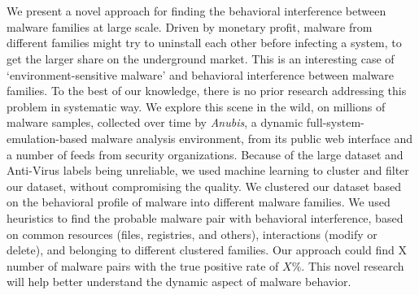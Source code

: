 \chapter{\abstractname}
We present a novel approach for finding the behavioral interference between malware families at large scale.
Driven by monetary profit, malware from different families might try to uninstall each other before infecting a system, to get the larger share on the underground market.
This is an interesting case of `environment-sensitive malware' and behavioral interference between malware families.
To the best of our knowledge, there is no prior research addressing this problem in systematic way.
We explore this scene in the wild, on millions of malware samples, collected over time by \emph{Anubis}, a dynamic full-system-emulation-based malware analysis environment, from its public web interface and a number of feeds from security organizations.
Because of the large dataset and Anti-Virus labels being unreliable, we used machine learning to cluster and filter our dataset, without compromising the quality.
We clustered our dataset based on the behavioral profile of malware into different malware families.
We used heuristics to find the probable malware pair with behavioral interference, based on common resources (files, registries, and others), interactions (modify or delete), and belonging to different clustered families.
Our approach could find X number of malware pairs with the true positive rate of $X\%$.
This novel research will help better understand the dynamic aspect of malware behavior.
